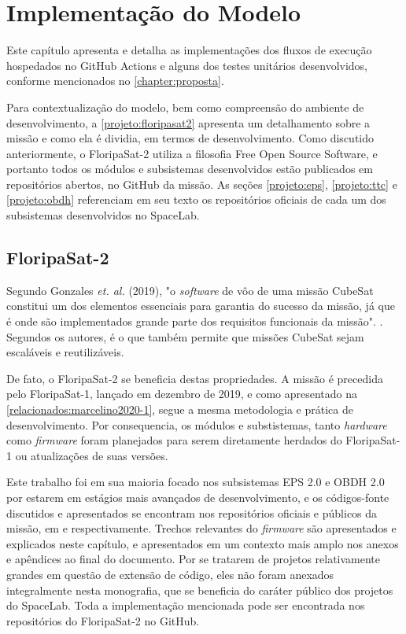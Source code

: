\chapter{Implementação do Modelo}
\label{chapter:projeto}
    Este capítulo apresenta e detalha as implementações dos fluxos de execução hospedados no GitHub Actions e alguns dos testes unitários desenvolvidos, conforme mencionados no \autoref{chapter:proposta}.
    
    Para contextualização do modelo, bem como compreensão do ambiente de desenvolvimento, a \autoref{projeto:floripasat2} apresenta um detalhamento sobre a missão e como ela é dividia, em termos de desenvolvimento. Como discutido anteriormente, o FloripaSat-2 utiliza a filosofia Free Open Source Software, e portanto todos os módulos e subsistemas desenvolvidos estão publicados em repositórios abertos, no GitHub da missão. As seções \ref{projeto:eps}, \ref{projeto:ttc} e \ref{projeto:obdh} referenciam em seu texto os repositórios oficiais de cada um dos subsistemas desenvolvidos no SpaceLab.
     
    
    \section{FloripaSat-2}
    \label{projeto:floripasat2}
    
        Segundo Gonzales \textit{et. al.} (2019), "o \textit{software} de vôo de uma missão CubeSat constitui um dos elementos essenciais para garantia do sucesso da missão, já que é onde são implementados grande parte dos requisitos funcionais da missão". \cite{gonzales-2019}. Segundos os autores, é o que também permite que missões CubeSat sejam escaláveis e reutilizáveis.
        
        De fato, o FloripaSat-2 se beneficia destas propriedades. A missão é precedida pelo FloripaSat-1, lançado em dezembro de 2019, e como apresentado na \autoref{relacionados:marcelino2020-1}, segue a mesma metodologia e prática de desenvolvimento. Por consequencia, os módulos e substistemas, tanto \textit{hardware} como \textit{firmware} foram planejados para serem diretamente herdados do FloripaSat-1 ou atualizações de suas versões.
        
        Este trabalho foi em sua maioria focado nos subsistemas EPS 2.0 e OBDH 2.0 por estarem em estágios mais avançados de desenvolvimento, e os códigos-fonte discutidos e apresentados se encontram nos repositórios oficiais e públicos da missão, em \cite{eps2-github} e \cite{obdh2-github} respectivamente. Trechos relevantes do \textit{firmware} são apresentados e explicados neste capítulo, e apresentados em um contexto mais amplo nos anexos e apêndices ao final do documento. Por se tratarem de projetos relativamente grandes em questão de extensão de código, eles não foram anexados integralmente nesta monografia, que se beneficia do caráter público dos projetos do SpaceLab. Toda a implementação mencionada pode ser encontrada nos repositórios do FloripaSat-2 no GitHub\cite{floripasat2}.
        
